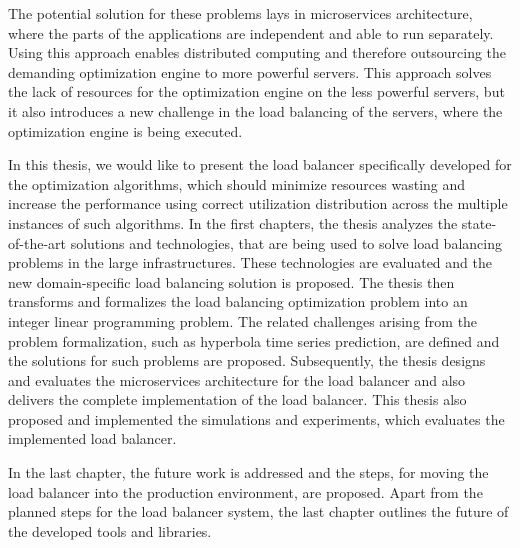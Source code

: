 The potential solution for these problems lays in microservices architecture,
where the parts of the applications are independent and able to run separately.
Using this approach enables distributed computing
and therefore outsourcing the demanding optimization engine to more powerful servers.
This approach solves the lack of resources for the optimization engine on the less powerful servers,
but it also introduces a new challenge in the load balancing of the servers,
where the optimization engine is being executed.

In this thesis, we would like to present the load balancer specifically developed for the optimization algorithms,
which should minimize resources wasting 
and increase the performance using correct utilization distribution across the multiple instances of such algorithms.
In the first chapters,
the thesis analyzes the state-of-the-art solutions and technologies,
that are being used to solve load balancing problems in the large infrastructures.
These technologies are evaluated 
and the new domain-specific load balancing solution is proposed.
The thesis then transforms and formalizes the load balancing optimization problem into an integer linear programming problem.
The related challenges arising from the problem formalization, such as hyperbola time series prediction, are defined 
and the solutions for such problems are proposed.
Subsequently, the thesis designs and evaluates the microservices architecture for the load balancer 
and also delivers the complete implementation of the load balancer.
This thesis also proposed and implemented the simulations and experiments, 
which evaluates the implemented load balancer.

In the last chapter,
the future work is addressed 
and the steps, for moving the load balancer into the production environment, are proposed.
Apart from the planned steps for the load balancer system,
the last chapter outlines the future of the developed tools and libraries.


